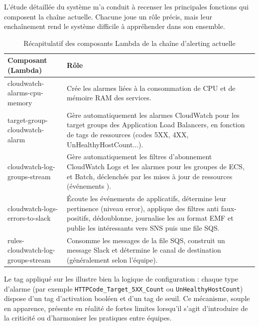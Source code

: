 L'étude détaillée du système m'a conduit à recenser les principales fonctions  qui composent
la chaîne actuelle. Chacune joue un rôle précis, mais leur enchaînement rend le système difficile à
appréhender dans son ensemble.

\begin{table}[h]
	\centering
	\caption{Récapitulatif des composants Lambda de la chaîne d'alerting actuelle}
	\label{tab:composants-lambda-actuels}
	\begin{tabular}{|p{}|p{}|}
		\hline
		\textbf{Composant (Lambda)} & \textbf{Rôle} \\
		\hline
		cloudwatch-alarms-cpu-memory & Crée les alarmes liées à la consommation de CPU et de mémoire RAM des services. \\
		\hline
		target-group-cloudwatch-alarm & Gère automatiquement les alarmes CloudWatch pour les target groups des Application Load Balancers, en fonction de tags de ressources (codes 5XX, 4XX, UnHealthyHostCount...). \\
		\hline
		cloudwatch-log-groups-stream & Gère automatiquement les filtres d'abonnement CloudWatch Logs et les alarmes pour les groupes de \lexique{logs} ECS, \lexique{Lambda} et Batch, déclenchés par les mises à jour de ressources (événements \lexique{CloudTrail}). \\
		\hline
		cloudwatch-logs-errors-to-slack & Écoute les événements de \lexique{logs} applicatifs, détermine leur pertinence (niveau error), applique des filtres anti faux-positifs, dédoublonne, journalise les \lexique{métriques} au format EMF et publie les \lexique{logs} intéressants vers SNS puis une file SQS. \\
		\hline
		rules-cloudwatch-log-groups-stream & Consomme les messages de la file SQS, construit un message Slack et détermine le canal de destination (généralement selon l'équipe). \\
		\hline
	\end{tabular}
\end{table}
\FloatBarrier

Le tag appliqué sur les  illustre bien la logique de configuration : chaque type d'alarme
(par exemple \texttt{HTTPCode\_Target\_5XX\_Count} ou \texttt{UnHealthyHostCount}) dispose d'un tag
d'activation booléen et d'un tag de seuil. Ce mécanisme, souple en apparence, présente en réalité de
fortes limites lorsqu'il s'agit d'introduire de la criticité ou d'harmoniser les pratiques entre équipes.

